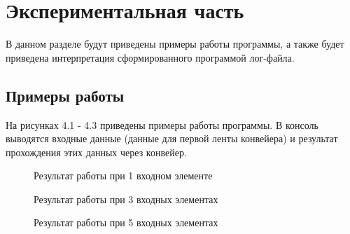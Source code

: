 \documentclass[a4paper,12pt]{report}
\begin{document}
\chapter{Экспериментальная часть}
\hspace{0.6cm}В данном разделе будут приведены примеры работы программы, а также будет приведена интерпретация сформированного программой лог-файла.
\section{Примеры работы}
\hspace{0.6cm}На рисунках 4.1 - 4.3 приведены примеры работы программы. В консоль выводятся входные данные (данные для первой ленты конвейера) и результат прохождения этих данных через конвейер.
\begin{figure}[ht!]
\caption{Результат работы при 1 входном элементе}
\end{figure}

\begin{figure}[ht!]
\caption{Результат работы при 3 входных элементах}
\end{figure}

\begin{figure}[ht!]
\caption{Результат работы при 5 входных элементах}
\end{figure}
\end{document}
